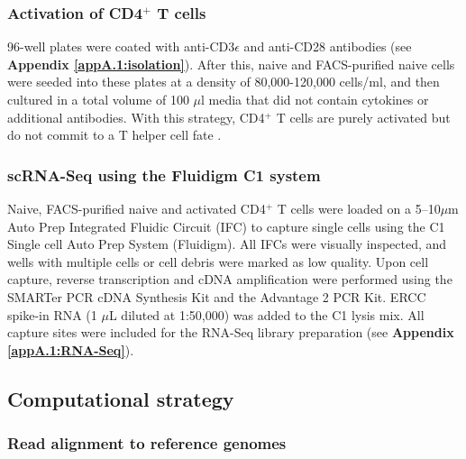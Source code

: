 \newpage

\subsubsection{Activation of CD4$^+$ T cells}

96-well plates were coated with anti-CD3$\epsilon$ and anti-CD28 antibodies (see \textbf{Appendix \ref{appA.1:isolation}}). After this, naive and FACS-purified naive cells were seeded into these plates at a density of 80,000-120,000 cells/ml, and then cultured in a total volume of 100 $\mu$l media that did not contain cytokines or additional antibodies. With this strategy, CD4$^+$ T cells are purely activated but do not commit to a T helper cell fate \citep{Stubbington2015, Zhu2010}.

\subsubsection{scRNA-Seq using the Fluidigm C1 system}

Naive, FACS-purified naive and activated CD4$^+$ T cells were loaded on a 5–10$\mu$m Auto Prep Integrated Fluidic Circuit (IFC) to capture single cells using the C1 Single cell Auto Prep System (Fluidigm). All IFCs were visually inspected, and wells with multiple cells or cell debris were marked as low quality. Upon cell capture, reverse transcription and cDNA amplification were performed using the SMARTer PCR cDNA Synthesis Kit and the Advantage 2 PCR Kit. ERCC spike-in RNA (1 $\mu$L diluted at 1:50,000) was added to the C1 lysis mix. All capture sites were included for the RNA-Seq library preparation (see \textbf{Appendix \ref{appA.1:RNA-Seq}}).

\subsection{Computational strategy}

\subsubsection{Read alignment to reference genomes}

